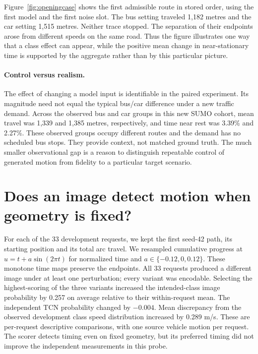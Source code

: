Figure~\ref{fig:openingcase} shows the first admissible route in stored order, using the first model and the first noise slot. The bus setting traveled 1,182 metres and the car setting 1,515 metres. Neither trace stopped. The separation of their endpoints arose from different speeds on the same road. Thus the figure illustrates one way that a class effect can appear, while the positive mean change in near-stationary time is supported by the aggregate rather than by this particular picture.

\paragraph{Control versus realism.}
The effect of changing a model input is identifiable in the paired experiment. Its magnitude need not equal the typical bus/car difference under a new traffic demand. Across the observed bus and car groups in this new SUMO cohort, mean travel was 1,339 and 1,385 metres, respectively, and time near rest was 3.39\% and 2.27\%. These observed groups occupy different routes and the demand has no scheduled bus stops. They provide context, not matched ground truth. The much smaller observational gap is a reason to distinguish repeatable control of generated motion from fidelity to a particular target scenario.



\section{Does an image detect motion when geometry is fixed?}
For each of the 33 development requests, we kept the first seed-42 path, its starting position and its total arc travel. We resampled cumulative progress at $u=t+a\sin(2\pi t)$ for normalized time and $a\in\{-0.12,0,0.12\}$. These monotone time maps preserve the endpoints. All 33 requests produced a different image under at least one perturbation; every variant was encodable. Selecting the highest-scoring of the three variants increased the intended-class image probability by 0.257 on average relative to their within-request mean. The independent TCN probability changed by $-0.004$. Mean discrepancy from the observed development class speed distribution increased by 0.289 m/s. These are per-request descriptive comparisons, with one source vehicle motion per request. The scorer detects timing even on fixed geometry, but its preferred timing did not improve the independent measurements in this probe.


